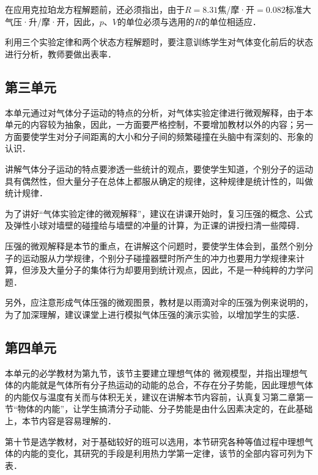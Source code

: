 在应用克拉珀龙方程解题前，还必须指出，由于$R=8.31$焦/摩·开$=0.082$标准大气压·升/摩·开，因此，$p$、$V$的单位必须与选用的$R$的单位相适应．

利用三个实验定律和两个状态方程解题时，要注意训练学生对气体变化前后的状态进行分析，教师要做出表率．

\subsection{第三单元}
本单元通过对气体分子运动的特点的分析，对气体实验定律进行微观解释，由于本单元的内容较为抽象，因此，一方面要严格控制，不要增加教材以外的内容；另一方面要使学生对分子间距离的大小和分子间的频繁碰撞在头脑中有深刻的、形象的认识．

讲解气体分子运动的特点要渗透一些统计的观点，要使学生知道，个别分子的运动具有偶然性，但大量分子在总体上都服从确定的规律，这种规律是统计性的，叫做统计规律．

为了讲好“气体实验定律的微观解释”，建议在讲课开始时，复习压强的概念、公式及弹性小球对墙壁的碰撞给与墙壁的冲量的计算，为正课的讲授扫清一些障碍．

压强的微观解释是本节的重点，在讲解这个问题时，要使学生体会到，虽然个别分子的运动服从力学规律，个别分子碰撞器壁时所产生的冲力也要用力学规律来计算，但涉及大量分子的集体行为却要用到统计观点，因此，不是一种纯粹的力学问题．

另外，应注意形成气体压强的微观图景，教材是以雨滴对伞的压强为例来说明的，为了加深理解，建议课堂上进行模拟气体压强的演示实验，以增加学生的实感．

\subsection{第四单元}
本单元的必学教材为第九节，该节主要建立理想气体的
微观模型，并指出理想气体的内能就是气体所有分子热运动的动能的总合，不存在分子势能，因此理想气体的内能仅与温度有关而与体积无关，建议在讲解本节内容前，认真复习第二章第一节“物体的内能”，让学生搞清分子动能、分子势能是由什么因素决定的，在此基础上，本节内容是容易理解的．

第十节是选学教材，对于基础较好的班可以选用，本节研究各种等值过程中理想气体的内能的变化，其研究的手段是利用热力学第一定律，该节的全部内容可列为下表．

